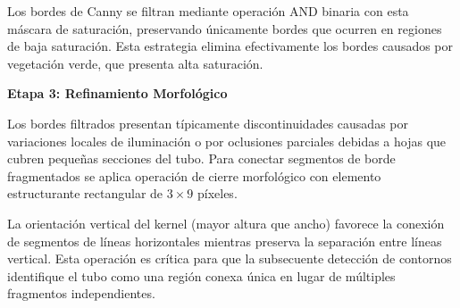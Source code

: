 Los bordes de Canny se filtran mediante operación AND binaria con esta máscara de saturación, preservando únicamente bordes que ocurren en regiones de baja saturación. Esta estrategia elimina efectivamente los bordes causados por vegetación verde, que presenta alta saturación.

\textbf{Etapa 3: Refinamiento Morfológico}

Los bordes filtrados presentan típicamente discontinuidades causadas por variaciones locales de iluminación o por oclusiones parciales debidas a hojas que cubren pequeñas secciones del tubo. Para conectar segmentos de borde fragmentados se aplica operación de cierre morfológico con elemento estructurante rectangular de $3 \times 9$ píxeles.

La orientación vertical del kernel (mayor altura que ancho) favorece la conexión de segmentos de líneas horizontales mientras preserva la separación entre líneas vertical. Esta operación es crítica para que la subsecuente detección de contornos identifique el tubo como una región conexa única en lugar de múltiples fragmentos independientes.

